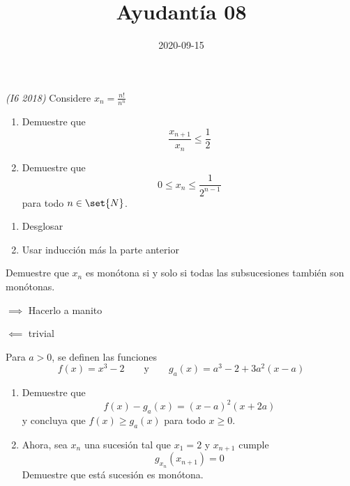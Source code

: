 \documentclass{ayudantia}
\title{Ayudantía 08}
\date{2020-09-15}
\begin{document}
\maketitle

\begin{prob}\textit{(I6 2018)}
    Considere \(x_n=\frac{n!}{n^n}\)
    \begin{enumerate}[label=(\alph*)]
        \item Demuestre que
        \begin{equation*}
            \frac{x_{n+1}}{x_n}\leq\frac12
        \end{equation*}
        \item Demuestre que
        \begin{equation*}
            0\leq x_n\leq\frac1{2^{n-1}}
        \end{equation*}
        para todo \(n\in\set{N}\).
    \end{enumerate}
\end{prob}

\begin{ans}
    \begin{sol}
        \begin{enumerate}[label=(\alph*)]
            \item Desglosar
            \item Usar inducción más la parte anterior
        \end{enumerate}
    \end{sol}
\end{ans}


\begin{prob}
    Demuestre que \(x_n\) es monótona si y solo si todas las subsucesiones también son monótonas.
\end{prob}

\begin{ans}
    \begin{sol}
        \(\implies\) Hacerlo a manito
        
        \(\impliedby\) trivial
    \end{sol}
\end{ans}


\begin{prob}
    Para \(a>0\), se definen las funciones
    \begin{equation*}
        f(x)=x^3-2\qquad\text{y}\qquad g_a(x)=a^3-2+3a^2(x-a)
    \end{equation*}
    \begin{enumerate}[label=(\alph*)]
        \item Demuestre que
        \begin{equation*}
            f(x)-g_a(x)=(x-a)^2(x+2a)
        \end{equation*}
        y concluya que \(f(x)\geq g_a(x)\) para todo \(x\geq 0\).
        \item Ahora, sea \(x_n\) una sucesión tal que \(x_1=2\) y \(x_{n+1}\) cumple
        \begin{equation*}
            g_{x_n}(x_{n+1})=0
        \end{equation*}
        Demuestre que está sucesión es monótona.
    \end{enumerate}
\end{prob}
\end{document}
